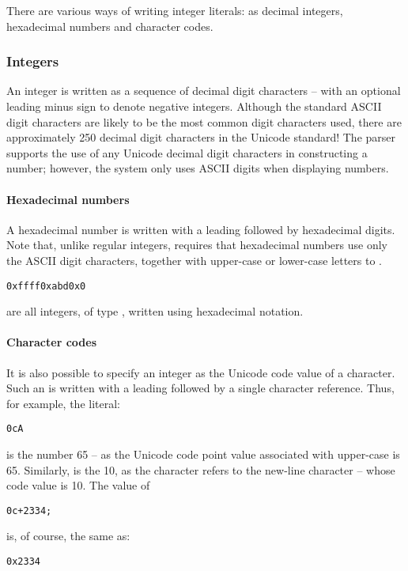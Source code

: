 There are various ways of writing integer literals: as decimal integers, hexadecimal numbers and character codes.

\subsubsection{Integers}
\label{expression:integer}
An integer is written as a sequence of decimal digit characters -- with an optional leading minus sign to denote negative integers. Although the standard ASCII digit characters are likely to be the most common digit characters used, there are approximately 250 decimal digit characters in the Unicode standard! The \go parser supports the use of any Unicode decimal digit characters in constructing a number; however, the \go system only uses ASCII digits when displaying numbers.

\paragraph{Hexadecimal numbers}
A hexadecimal number is written with a leading  followed by hexadecimal digits. Note that, unlike regular integers, \go requires that hexadecimal numbers use only the ASCII digit characters, together with upper-case or lower-case letters  to .

\begin{alltt}
0xffff 0xabd 0x0
\end{alltt}
are all integers, of type , written using hexadecimal notation.

\paragraph{Character codes}
It is also possible to specify an integer as the Unicode code value of a character. Such an  is written with a leading  followed by a single character reference. Thus, for example, the literal:
\begin{alltt}
0cA
\end{alltt}
is the number 65 -- as the Unicode code point value associated with upper-case  is 65. Similarly,  is the  10, as the character  refers to the new-line character -- whose code value is 10. The value of
\begin{alltt}
0c\bsl{}+2334;
\end{alltt}
is, of course, the same as:
\begin{alltt}
0x2334
\end{alltt}

